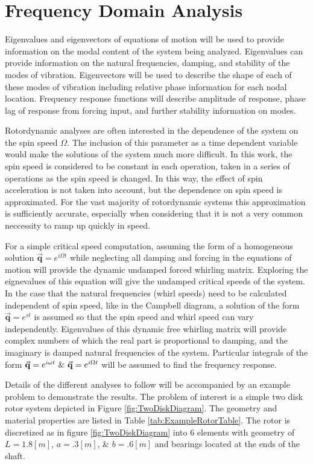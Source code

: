 \chapter{Frequency Domain Analysis}\label{FrequencyDomainAnalysis}
Eigenvalues and eigenvectors of equations of motion will be used to provide information on the modal content of the system being analyzed. Eigenvalues can provide information on the natural frequencies, damping, and stability of the modes of vibration. Eigenvectors will be used to describe the shape of each of these modes of vibration including relative phase information for each nodal location. Frequency response functions will describe amplitude of response, phase lag of response from forcing input, and further stability information on modes.\par
Rotordynamic analyses are often interested in the dependence of the system on the spin speed $ \Omega $. The inclusion of this parameter as a time dependent variable would make the solutions of the system much more difficult. In this work, the spin speed is considered to be constant in each operation, taken in a series of operations as the spin speed is changed. In this way, the effect of spin acceleration is not taken into account, but the dependence on spin speed is approximated. For the vast majority of rotordynamic systems this approximation is sufficiently accurate, especially when considering that it is not a very common neccessity to ramp up quickly in speed.\par
For a simple critical speed computation, assuming the form of a homogeneous solution $ \vec{\mathbf{q}}=e^{i\Omega t} $ while neglecting all damping and forcing in the equations of motion will provide the dynamic undamped forced whirling matrix. Exploring the eignevalues of this equation will give the undamped critical speeds of the system. In the case that the natural frequencies (whirl speeds) need to be calculated independent of spin speed, like in the Campbell diagram, a solution of the form $  \vec{\mathbf{q}}=e^{s t}$ is assumed so that the spin speed and whirl speed can vary independently. Eigenvalues of this dynamic free whirling matrix will provide complex numbers of which the real part is proportional to damping, and the imaginary is damped natural frequencies of the system. Particular integrals of the form $ \vec{\mathbf{q}}=e^{i\omega t}\ \&\ \vec{\mathbf{q}}=e^{i\Omega t} $ will be assumed to find the frequency response.\par 
Details of the different analyses to follow will be accompanied by an example problem to demonstrate the results. The problem of interest is a simple two disk rotor system depicted in Figure \ref{fig:TwoDiskDiagram}. The geometry and material properties are listed in Table \ref{tab:ExampleRotorTable}. The rotor is discretized as in figure \ref{fig:TwoDiskDiagram} into 6 elements with geometry of $ L=1.8[m] $, $ a=.3[m] $, \& $ b=.6[m] $ and bearings located at the ends of the shaft.\par 
